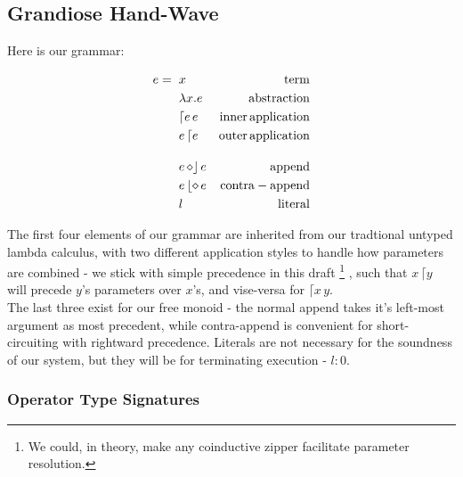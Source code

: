 \documentclass{article}
\begin{document}
\subsection{Grandiose Hand-Wave}

\begin{flushleft}
Here is our grammar:
\end{flushleft}

\begin{align}
e = \hspace{2mm} & x                          & \mathrm{term}\\
                 & \lambda x.e                & \mathrm{abstraction}\\
                 & \lceil e \, e              & \mathrm{inner \, application}\\
                 & e \, \lceil e              & \mathrm{outer \, application}\\[1em]
                 & e \, \diamond \rfloor \, e & \mathrm{append}\\
                 & e \, \lfloor \diamond \, e & \mathrm{contra-append}\\
                 & l                          & \mathrm{literal}
\end{align}

\begin{flushleft}
The first four elements of our grammar are inherited from our tradtional untyped
lambda calculus, with two different application styles to handle how parameters
are combined - we stick with simple precedence in this draft
\footnote{
  We could, in theory, make any coinductive zipper facilitate parameter resolution.
}
, such that
$x \, \lceil y$ will precede $y$'s parameters over $x$'s, and vise-versa for
$\lceil x \, y$.\\

\vspace{2mm}
The last three exist for our free monoid - the normal append takes it's left-most
argument as most precedent, while contra-append is convenient for short-circuiting
with rightward precedence.
Literals are not necessary for the soundness of our system, but they will be for
terminating execution - $l : 0$.
\end{flushleft}

\subsubsection{Operator Type Signatures}
\end{document}
